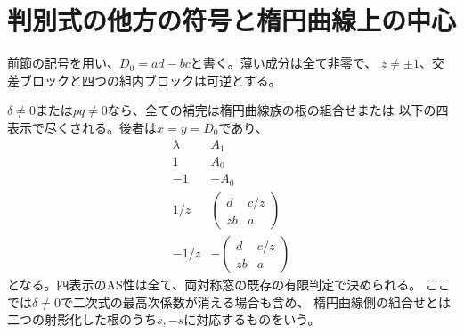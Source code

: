\section{判別式の他方の符号と楕円曲線上の中心}
\label{sec:klein-second-pairings}
前節の記号を用い、$D_0=ad-bc$と書く。薄い成分は全て非零で、
$z\ne\pm1$、交差ブロックと四つの組内ブロックは可逆とする。

\begin{theorem}\label{thm:klein-other-pairings}
$\delta\ne0$または$pq\ne0$なら、全ての補完は楕円曲線族の根の組合せまたは
以下の四表示で尽くされる。後者は$x=y=D_0$であり、
\[
\begin{array}{c|c}
 \lambda & A_1 \\ \hline
 1&A_0\\
 -1&-A_0\\
 1/z&\left(\begin{smallmatrix}d&c/z\\zb&a\end{smallmatrix}\right)\\
 -1/z&-\left(\begin{smallmatrix}d&c/z\\zb&a\end{smallmatrix}\right)
\end{array}
\]
となる。四表示のAS性は全て、両対称窓の既存の有限判定で決められる。
ここでは$\delta\ne0$で二次式の最高次係数が消える場合も含め、
楕円曲線側の組合せとは二つの射影化した根のうち$s,-s$に対応するものをいう。
\end{theorem}
